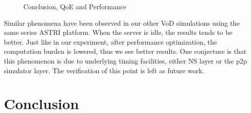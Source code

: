 \documentclass[11pt,a4paper]{article}
\begin{document}
\begin{figure}[htb]
\centering
	\caption{Conclusion, QoE and Performance}
	\label{fig:simu_con_detail}
\end{figure}

Similar phenomena have been observed in our other VoD simulations using 
the same series ASTRI platform\cite{huang2010simulation}. When the server 
is idle, the results tends to be better. Just like in our experiment, after 
performance optimization, the computation burden is lowered, thus we see 
better results. One conjecture is that this phenomenon is due to underlying 
timing facilities, either NS\cite{ns,pdns} layer or the p2p simulator 
layer\cite{huang2010simulation}. The verification of this point is
left as future work. 


\section{Conclusion}
\end{document}
